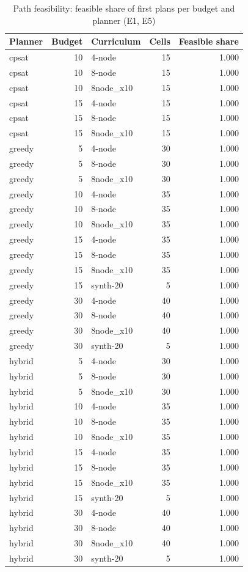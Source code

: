 \begin{table}[htbp]
\centering\small
\caption{Path feasibility: feasible share of first plans per budget and planner (E1, E5)}
\label{tab:t12b}
\begin{tabular}{lrlrr}
\toprule
Planner & Budget & Curriculum & Cells & Feasible share \\
\midrule
cpsat & 10 & 4-node & 15 & 1.000 \\
cpsat & 10 & 8-node & 15 & 1.000 \\
cpsat & 10 & 8node\_x10 & 15 & 1.000 \\
cpsat & 15 & 4-node & 15 & 1.000 \\
cpsat & 15 & 8-node & 15 & 1.000 \\
cpsat & 15 & 8node\_x10 & 15 & 1.000 \\
greedy & 5 & 4-node & 30 & 1.000 \\
greedy & 5 & 8-node & 30 & 1.000 \\
greedy & 5 & 8node\_x10 & 30 & 1.000 \\
greedy & 10 & 4-node & 35 & 1.000 \\
greedy & 10 & 8-node & 35 & 1.000 \\
greedy & 10 & 8node\_x10 & 35 & 1.000 \\
greedy & 15 & 4-node & 35 & 1.000 \\
greedy & 15 & 8-node & 35 & 1.000 \\
greedy & 15 & 8node\_x10 & 35 & 1.000 \\
greedy & 15 & synth-20 & 5 & 1.000 \\
greedy & 30 & 4-node & 40 & 1.000 \\
greedy & 30 & 8-node & 40 & 1.000 \\
greedy & 30 & 8node\_x10 & 40 & 1.000 \\
greedy & 30 & synth-20 & 5 & 1.000 \\
hybrid & 5 & 4-node & 30 & 1.000 \\
hybrid & 5 & 8-node & 30 & 1.000 \\
hybrid & 5 & 8node\_x10 & 30 & 1.000 \\
hybrid & 10 & 4-node & 35 & 1.000 \\
hybrid & 10 & 8-node & 35 & 1.000 \\
hybrid & 10 & 8node\_x10 & 35 & 1.000 \\
hybrid & 15 & 4-node & 35 & 1.000 \\
hybrid & 15 & 8-node & 35 & 1.000 \\
hybrid & 15 & 8node\_x10 & 35 & 1.000 \\
hybrid & 15 & synth-20 & 5 & 1.000 \\
hybrid & 30 & 4-node & 40 & 1.000 \\
hybrid & 30 & 8-node & 40 & 1.000 \\
hybrid & 30 & 8node\_x10 & 40 & 1.000 \\
hybrid & 30 & synth-20 & 5 & 1.000 \\
\bottomrule
\end{tabular}
\end{table}
